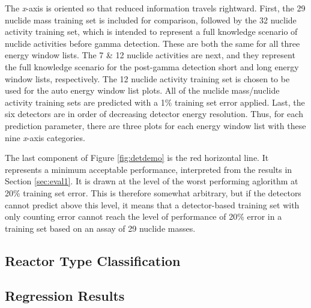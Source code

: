 The \textit{x}-axis is oriented so that reduced information travels rightward.
First, the 29 nuclide mass training set is included for comparison, followed by
the 32 nuclide activity training set, which is intended to represent a full
knowledge scenario of nuclide activities before gamma detection. These are both
the same for all three energy window lists.  The 7 \& 12 nuclide activities are
next, and they represent the full knowledge scenario for the post-gamma
detection short and long energy window lists, respectively.  The 12 nuclide
activity training set is chosen to be used for the auto energy window list
plots.  All of the nuclide mass/nuclide activity training sets are predicted
with a 1\% training set error applied.  Last, the six detectors are in order of
decreasing detector energy resolution. Thus, for each prediction parameter,
there are three plots for each energy window list with these nine
\textit{x}-axis categories. 

The last component of Figure \ref{fig:detdemo} is the red horizontal line.  It
represents a minimum acceptable performance, interpreted from the results in
Section \ref{sec:eval1}. It is drawn at the level of the worst performing
aglorithm at 20\% training set error.  This is therefore somewhat arbitrary,
but if the detectors cannot predict above this level, it means that a
detector-based training set with only counting error cannot reach the level of
performance of 20\% error in a training set based on an assay of 29 nuclide
masses.

\subsection{Reactor Type Classification}

\label{sec:exp2_rxtr}

\subsection{Regression Results}

\label{sec:exp2_reg}
